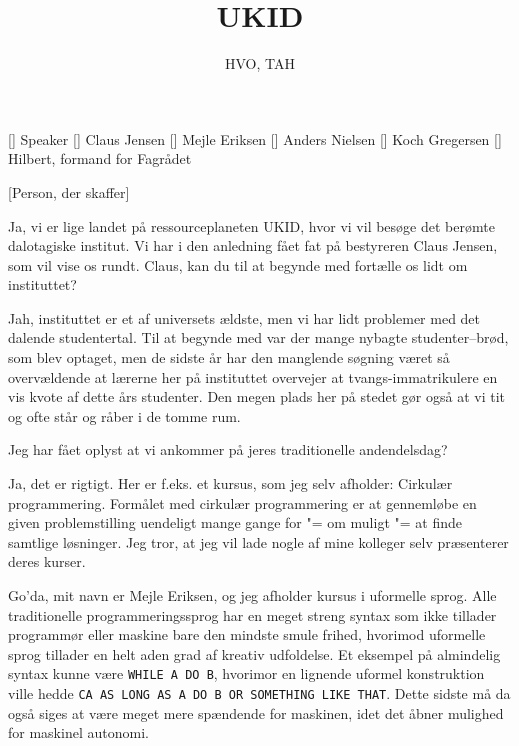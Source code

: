 \documentclass[a4paper,11pt]{article}
\title{UKID}
\author{HVO, TAH}
\begin{document}
\maketitle

\begin{roles}
[] Speaker
[] Claus Jensen
[] Mejle Eriksen
[] Anders Nielsen
[] Koch Gregersen
[] Hilbert, formand for Fagrådet
\end{roles}

\begin{props}
[Person, der skaffer]
\end{props}


\begin{sketch}


   Ja, vi er lige landet på ressourceplaneten UKID, hvor vi
  vil besøge det berømte dalotagiske institut.  Vi har i den anledning
  fået fat på bestyreren Claus Jensen, som vil vise os
  rundt.  Claus, kan du til at begynde med
  fortælle os lidt om instituttet?

   Jah, instituttet er et af universets ældste, men vi har
  lidt problemer med det dalende studentertal.  Til at begynde med var
  der mange nybagte studenter--brød, som blev optaget, men de sidste
  år har den manglende søgning været så overvældende at lærerne her på
  instituttet overvejer at tvangs-immatrikulere en vis kvote af dette
  års studenter.  Den megen plads her på stedet gør også at vi tit og
  ofte står og råber i de tomme rum.

   Jeg har fået oplyst at vi ankommer på jeres traditionelle andendelsdag?


   Ja, det er rigtigt.  Her er f.eks. et kursus, som jeg selv
  afholder: Cirkulær programmering.  Formålet med
  cirkulær programmering er at gennemløbe en given problemstilling
  uendeligt mange gange for "= om muligt "= at finde samtlige
  løsninger.  Jeg tror, at jeg vil lade nogle af mine kolleger selv
  præsenterer deres kurser.

   Go'da, mit navn er Mejle Eriksen, og jeg afholder kursus i
  uformelle sprog.  Alle traditionelle programmeringssprog har en
  meget streng syntax som ikke tillader programmør eller maskine bare
  den mindste smule frihed, hvorimod uformelle sprog tillader en helt
  aden grad af kreativ udfoldelse.  Et eksempel på almindelig syntax
  kunne være {\tt WHILE A DO B}, hvorimor en lignende uformel
  konstruktion ville hedde {\tt CA AS LONG AS A DO B OR SOMETHING LIKE
    THAT}.  Dette sidste må da også siges at være meget mere spændende
  for maskinen, idet det åbner mulighed for maskinel autonomi.


\end{sketch}
\end{document}
